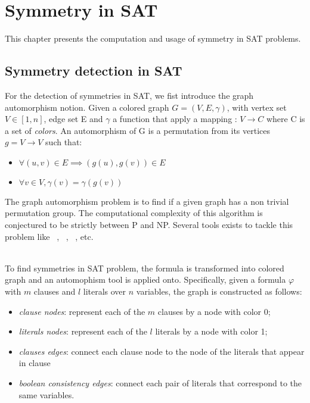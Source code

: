 \chapter{Symmetry in SAT}\label{chap:symmetryinsat}

This chapter presents the computation and usage of symmetry in SAT problems.

\section{Symmetry detection in SAT}


For the detection of symmetries in SAT, we fist introduce the graph automorphism notion.
Given a colored graph $G = (V, E, \gamma)$, with vertex set $V \in  [1, n] $, edge set E and
$\gamma$ a function that apply a mapping : $V \rightarrow C$ where C is a set of \emph{colors}.
An automorphism of G is a permutation from its vertices $g = V \rightarrow V$ 
such that:
\begin{itemize}
	\item $\forall (u, v) \in E \implies (g(u), g(v)) \in E$
	\item $\forall v \in V, \gamma(v) = \gamma(g(v))$
\end{itemize}

The graph automorphism problem is to find if a given graph has a non trivial permutation group. 
The computational complexity of this algorithm is conjectured to be strictly between P and NP.
Several tools exists to tackle this problem like \saucy~\cite{katebi2010symmetry},
\bliss~\cite{JunttilaKaski:ALENEX2007}, \nauty~\cite{mckay2003nauty}, etc.


\\
To find symmetries in SAT problem, the formula is transformed into colored graph
and an automophism tool is applied onto. Specifically, given a formula $\varphi$ with
$m$ clauses and $l$ literals over $n$ variables, the graph is constructed as follows:
\begin{itemize}
	\item \emph{clause nodes}: represent each of the $m$ clauses by a node with color 0;
	\item \emph{literals nodes}: represent each of the $l$ literals by a node with color 1;
	\item \emph{clauses edges}: connect each clause node to the node of the literals that appear in clause
	\item \emph{boolean consistency edges}: connect each pair of literals that correspond to the same variables.
\end{itemize}


